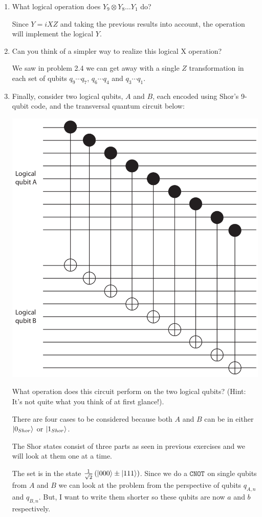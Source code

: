 \documentclass[12pt]{article}
\newcommand{\rsqrt}[1]{\ensuremath{\frac{1}{\sqrt{#1}}}}
\newenvironment{answer}{\begingroup\setlength{\leftskip}{-\leftmargin}\begin{framed}}{\end{framed}\endgroup}
\newcommand{\CNOT}[1]{\ensuremath{\texttt{CNOT}_{#1}}}
\begin{document}
\begin{enumerate}
    \item What logical operation does $Y_9 \otimes Y_8 \dots Y_1$ do?

    \begin{answer}
        Since $Y = iXZ$ and taking the previous results into account, the operation will implement the logical $Y$.
    \end{answer}

    \item Can you think of a simpler way to realize this logical X operation?

    \begin{answer}
        We saw in problem 2.4 we can get away with a single $Z$ transformation in each set of qubits $q_9 \cdots q_7$, $q_6 \cdots q_4$ and $q_3 \cdots q_1$.
    \end{answer}

    \item Finally, consider two logical qubits, $A$ and $B$, each encoded using Shor's 9-qubit code, and the transversal quantum circuit below:

    \begin{center}\includegraphics[width=.4\textwidth]{problem-4.png}\end{center}

    What operation does this circuit perform on the two logical qubits? (Hint: It's not quite what you think of at first glance!).

    \begin{answer}
        There are four cases to be considered because both $A$ and $B$ can be in either $\ket{0_{Shor}}$ or $\ket{1_{Shor}}$.

        The Shor states consist of three parts as seen in previous exercises and we will look at them one at a time.

        The set is in the state $\rsqrt{2}\left(\ket{000} \pm \ket{111}\right)$. Since we do a \CNOT{} on single qubits from $A$ and $B$ we can look at the problem from the perspective of qubits $q_{A,n}$ and $q_{B,n}$. But, I want to write them shorter so these qubits are now $a$ and $b$ respectively.


\end{answer}
\end{enumerate}
\end{document}
